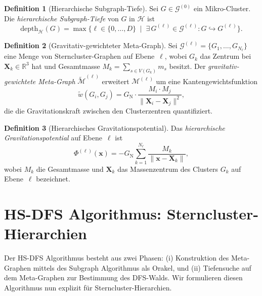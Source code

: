 ﻿\documentclass[a4paper,12pt]{report}
\theoremstyle{definition}
\newtheorem{definition}{Definition}
\begin{document}
\begin{definition}[Hierarchische Subgraph-Tiefe]
\label{def:hier_tiefe}
Sei $G \in \mathcal{G}^{(0)}$ ein Mikro-Cluster. Die \emph{hierarchische Subgraph-Tiefe} von $G$ in $\mathcal{H}$ ist
\[
\mathrm{depth}_\mathcal{H}(G) = \max\bigl\{\ell \in \{0,\ldots,D\} \;\mid\;
\exists\, G^{(\ell)} \in \mathcal{G}^{(\ell)} \colon G \hookrightarrow G^{(\ell)}\bigr\}.
\]
\end{definition}

\begin{definition}[Gravitativ-gewichteter Meta-Graph]
\label{def:gravmeta}
Sei $\mathcal{G}^{(\ell)} = \{G_1,\ldots,G_{N_\ell}\}$ eine Menge von Sterncluster-Graphen auf Ebene~$\ell$, wobei $G_k$ das Zentrum bei $\mathbf{X}_k \in \mathbb{R}^3$ hat und Gesamtmasse $M_k = \sum_{s \in V(G_k)} m_s$ besitzt. Der \emph{gravitativ-gewichtete Meta-Graph} $\tilde{\mathcal{M}}^{(\ell)}$ erweitert $\mathcal{M}^{(\ell)}$ um eine Kantengewichtsfunktion
\[
\tilde{w}(G_i, G_j) = G_\mathrm{N} \cdot \frac{M_i \cdot M_j}{\|\mathbf{X}_i - \mathbf{X}_j\|^2},
\]
die die Gravitationskraft zwischen den Clusterzentren quantifiziert.
\end{definition}

\begin{definition}[Hierarchisches Gravitationspotential]
\label{def:hier_potential}
Das \emph{hierarchische Gravitationspotential} auf Ebene~$\ell$ ist
\[
\Phi^{(\ell)}(\mathbf{x}) = -G_\mathrm{N} \sum_{k=1}^{N_\ell}
\frac{M_k}{\|\mathbf{x} - \mathbf{X}_k\|},
\]
wobei $M_k$ die Gesamtmasse und $\mathbf{X}_k$ das Massenzentrum des Clusters $G_k$ auf Ebene~$\ell$ bezeichnet.
\end{definition}

\section{HS-DFS Algorithmus: Sterncluster-Hierarchien}
\label{ssec:hsdfs_algo}

Der HS-DFS Algorithmus \cite{epp2026msubgraph} besteht aus zwei Phasen: (i) Konstruktion des Meta-Graphen mittels des Subgraph Algorithmus als Orakel, und (ii) Tiefensuche auf dem Meta-Graphen zur Bestimmung des DFS-Walds. Wir formulieren diesen Algorithmus nun explizit für Sterncluster-Hierarchien.
\end{document}
